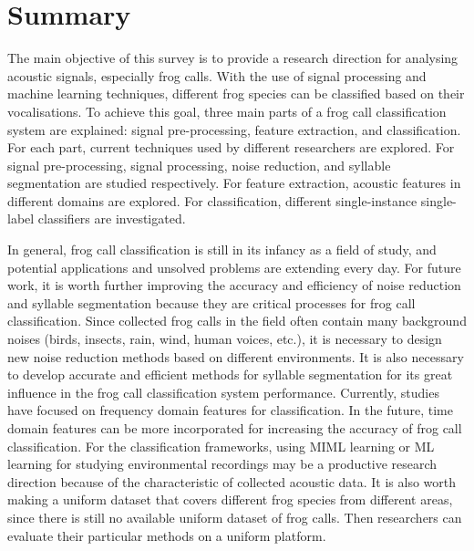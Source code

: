 \section{Summary}
\label{conclusion}
The main objective of this survey is to provide a research direction for analysing acoustic signals, especially frog calls. With the use of signal processing and machine learning techniques, different frog species can be classified based on their vocalisations. To achieve this goal, three main parts of a frog call classification system are explained: signal pre-processing, feature extraction, and classification. For each part, current techniques used by different researchers are explored. For signal pre-processing, signal processing, noise reduction, and syllable segmentation are studied respectively. For feature extraction, acoustic features in different domains are explored. For classification, different single-instance single-label classifiers are investigated. 

In general, frog call classification is still in its infancy as a field of study, and potential applications and unsolved problems are extending every day. For future work, it is worth further improving the accuracy and efficiency of noise reduction and syllable segmentation because they are critical processes for frog call classification. Since collected frog calls in the field often contain many background noises (birds, insects, rain, wind, human voices, etc.), it is necessary to design new noise reduction methods based on different environments. It is also necessary to develop accurate and efficient methods for syllable segmentation for its great influence in the frog call classification system performance. Currently, studies have focused on frequency domain features for classification. In the future, time domain features can be more incorporated for increasing the accuracy of frog call classification. For the classification frameworks, using MIML learning or ML learning for studying environmental recordings may be a productive research direction because of the characteristic of collected acoustic data. It is also worth making a uniform dataset that covers different frog species from different areas, since there is still no available uniform dataset of frog calls. Then researchers can evaluate their particular methods on a uniform platform.




